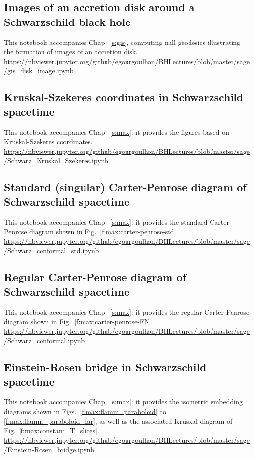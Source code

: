 \subsection{Images of an accretion disk around a Schwarzschild black hole} \label{s:sam:gis_disk_image}
%
This notebook accompanies Chap.~\ref{s:gis}, computing null geodesics illustrating the formation of images of an accretion disk.\\[1ex]
{\footnotesize
\url{https://nbviewer.jupyter.org/github/egourgoulhon/BHLectures/blob/master/sage/gis_disk_image.ipynb}
}

\subsection{Kruskal-Szekeres coordinates in Schwarzschild spacetime} \label{s:sam:Schwarz_Kruskal_Szekeres}

This notebook accompanies Chap.~\ref{s:max}: it provides the figures based on
Kruskal-Szekeres coordinates.\\[1ex]
{\footnotesize
\url{https://nbviewer.jupyter.org/github/egourgoulhon/BHLectures/blob/master/sage/Schwarz_Kruskal_Szekeres.ipynb}
}

\subsection{Standard (singular) Carter-Penrose diagram of Schwarzschild spacetime}
\label{s:sam:Schwarz_conformal_std}
This notebook accompanies Chap.~\ref{s:max}: it provides the standard
Carter-Penrose diagram shown in Fig.~\ref{f:max:carter-penrose-std}.\\[1ex]
{\footnotesize
\url{https://nbviewer.jupyter.org/github/egourgoulhon/BHLectures/blob/master/sage/Schwarz_conformal_std.ipynb}
}

\subsection{Regular Carter-Penrose diagram of Schwarzschild spacetime}
\label{s:sam:Schwarz_conformal}
This notebook accompanies Chap.~\ref{s:max}: it provides the regular
Carter-Penrose diagram shown in Fig.~\ref{f:max:carter-penrose-FN}.\\[1ex]
{\footnotesize
\url{https://nbviewer.jupyter.org/github/egourgoulhon/BHLectures/blob/master/sage/Schwarz_conformal.ipynb}
}

\subsection{Einstein-Rosen bridge in Schwarzschild spacetime}
\label{s:sam:Einstein-Rosen_bridge}
This notebook accompanies Chap.~\ref{s:max}: it provides the
isometric embedding diagrams shown in Figs.~\ref{f:max:flamm_paraboloid}
to \ref{f:max:flamm_paraboloid_far}, as well as the associated
Kruskal diagram of Fig.~\ref{f:max:constant_T_slices}.\\[1ex]
{\footnotesize
\url{https://nbviewer.jupyter.org/github/egourgoulhon/BHLectures/blob/master/sage/Einstein-Rosen_bridge.ipynb}
}

